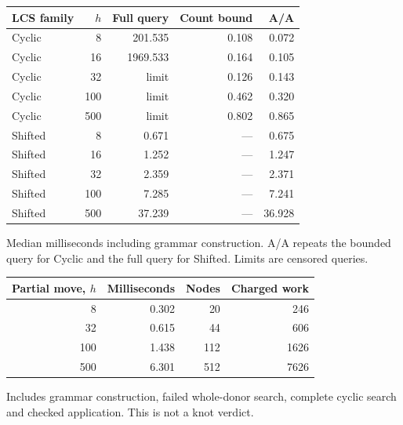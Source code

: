 \begin{center}\small
\begin{tabular}{@{}lrrrr@{}}
\toprule
LCS family & $h$ & Full query & Count bound & A/A \\
\midrule
Cyclic & 8 & 201.535 & 0.108 & 0.072 \\
Cyclic & 16 & 1969.533 & 0.164 & 0.105 \\
Cyclic & 32 & limit & 0.126 & 0.143 \\
Cyclic & 100 & limit & 0.462 & 0.320 \\
Cyclic & 500 & limit & 0.802 & 0.865 \\
Shifted & 8 & 0.671 & --- & 0.675 \\
Shifted & 16 & 1.252 & --- & 1.247 \\
Shifted & 32 & 2.359 & --- & 2.371 \\
Shifted & 100 & 7.285 & --- & 7.241 \\
Shifted & 500 & 37.239 & --- & 36.928 \\
\bottomrule
\end{tabular}
\end{center}
Median milliseconds including grammar construction. A/A repeats the bounded query for Cyclic and the full query for Shifted. Limits are censored queries.
\begin{center}\small
\begin{tabular}{@{}rrrr@{}}
\toprule
Partial move, $h$ & Milliseconds & Nodes & Charged work \\
\midrule
8 & 0.302 & 20 & 246 \\
32 & 0.615 & 44 & 606 \\
100 & 1.438 & 112 & 1626 \\
500 & 6.301 & 512 & 7626 \\
\bottomrule
\end{tabular}
\end{center}
Includes grammar construction, failed whole-donor search, complete cyclic search and checked application. This is not a knot verdict.
